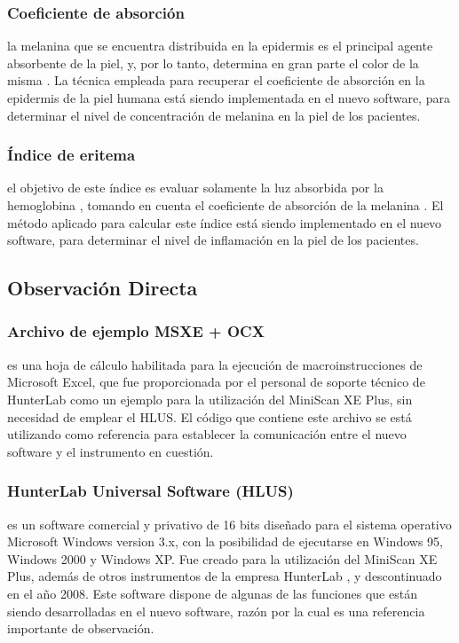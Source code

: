\documentclass[conference]{IEEEtran}
\begin{document}
		\subsubsection{Coeficiente de absorci\'{o}n}
			la melanina que se encuentra distribuida en la epidermis es el  principal agente absorbente de la piel, y, por lo tanto, determina en gran parte el color de la misma \cite{Narea}. La t\'{e}cnica empleada para recuperar el coeficiente de absorci\'{o}n en la epidermis de la piel humana \cite{Narea} est\'{a} siendo implementada en el nuevo software, para determinar el nivel de concentraci\'{o}n de melanina en la piel de los pacientes.
		
		\subsubsection{\'{I}ndice de eritema}
			el objetivo de este \'{i}ndice es evaluar solamente la luz absorbida por la hemoglobina \cite{Bersha}, tomando en cuenta el coeficiente de absorci\'{o}n de la melanina \cite{Narea}. El m\'{e}todo aplicado para calcular este \'{i}ndice \cite{Bersha} est\'{a} siendo implementado en el nuevo software, para determinar el nivel de inflamaci\'{o}n en la piel de los pacientes.
	
	\subsection{Observaci\'{o}n Directa}
		
		\subsubsection{Archivo de ejemplo MSXE + OCX}
		es una hoja de c\'{a}lculo habilitada para la ejecuci\'{o}n de macroinstrucciones de Microsoft Excel, que fue proporcionada por el personal de soporte t\'{e}cnico de HunterLab \cite{HunterLab} como un ejemplo para la utilizaci\'{o}n del MiniScan XE Plus, sin necesidad de emplear el HLUS. El c\'{o}digo que contiene este archivo se est\'{a} utilizando como referencia para establecer la comunicaci\'{o}n entre el nuevo software y el instrumento en cuesti\'{o}n.
			
		\subsubsection{HunterLab Universal Software (HLUS)}
			es un software \mbox{comercial} y privativo de 16 bits dise\~{n}ado para el sistema \mbox{operativo} Microsoft Windows version 3.x, con la posibilidad de ejecutarse en Windows 95, Windows 2000 y Windows XP. Fue creado para la utilizaci\'{o}n del \mbox{MiniScan} XE Plus, adem\'{a}s de otros instrumentos de la empresa \mbox{HunterLab} \cite{HunterLab-manual}, y descontinuado en el a\~{n}o 2008. Este software dispone de algunas de las funciones que est\'{a}n siendo desarrolladas en el nuevo software, raz\'{o}n por la cual es una referencia importante de observaci\'{o}n.
\end{document}
